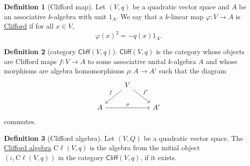 \documentclass[a4paper]{report}
\newcommand{\defn}[1]{\ul{#1}}
\newcommand{\cliff}{\mathrm{C}\ell}
\theoremstyle{definition}
\newtheorem{definition}{Definition}[section]
\theoremstyle{plain}
\theoremstyle{remark}
\begin{document}
\begin{definition}[Clifford map]
  \label{def:cliffordmap}
  Let $(V,q)$ be a quadratic vector space and $A$ be an associative $k$-algebra with unit $1_{A}$. We say that a $k$-linear map $\varphi\colon V \to A$ is \defn{Clifford} if for all $x \in V$,
  \begin{equation*}
    \varphi(x)^{2} = -q(x)1_{A}.
  \end{equation*}
\end{definition}

\begin{definition}[category $\mathsf{Cliff}(V,q)$]
  \label{def:cliffordcategory}
  $\mathsf{Cliff}(V,q)$ is the category whose objects are Clifford maps $f\colon V \to A$ to some associative unital $k$-algebra $A$ and whose morphisms are algebra homomorphisms $\rho\colon A \to A'$ such that the diagram
  \begin{equation*}
    \begin{tikzcd}
      & V \arrow[dl, swap, "f"] \arrow[dr, "f'"] & \\
      A \arrow[rr, "\rho"] & & A'
    \end{tikzcd}
  \end{equation*}
  commutes.
\end{definition}

\begin{definition}[Clifford algebra]
  \label{def:cliffordalgebra}
  Let $(V,Q)$ be a quadratic vector space. The \defn{Clifford algebra} $\cliff(V,q)$ is the algebra from the initial object $(\iota, \cliff(V,q))$ in the category $\mathsf{Cliff}(V,q)$, if it exists.
\end{definition}
\end{document}
